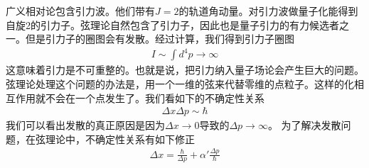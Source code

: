  
 广义相对论包含引力波。他们带有$J = 2$的轨道角动量。对引力波做量子化能得到自旋2的引力子。弦理论自然包含了引力子，因此也是量子引力的有力候选者之一。但是引力子的圈图会有发散。经过计算，我们得到引力子圈图
 \begin{align}
 I \sim \int d^4 p \rightarrow \infty 
 \end{align}
 这意味着引力是不可重整的。也就是说，把引力纳入量子场论会产生巨大的问题。弦理论处理这个问题的办法是，用一个一维的弦来代替零维的点粒子。这样的化相互作用就不会在一个点发生了。我们看如下的不确定性关系
 \begin{align}
\Delta x \Delta p \sim \hbar  
 \end{align}
我们可以看出发散的真正原因是因为$\Delta x \rightarrow 0$导致的$\Delta p \rightarrow  \infty  $。  为了解决发散问题，在弦理论中，不确定性关系有如下修正
\begin{align}
\Delta x  = \frac{\hbar}{\Delta p} + \alpha' \frac{\Delta p}{\hbar }
\end{align}
